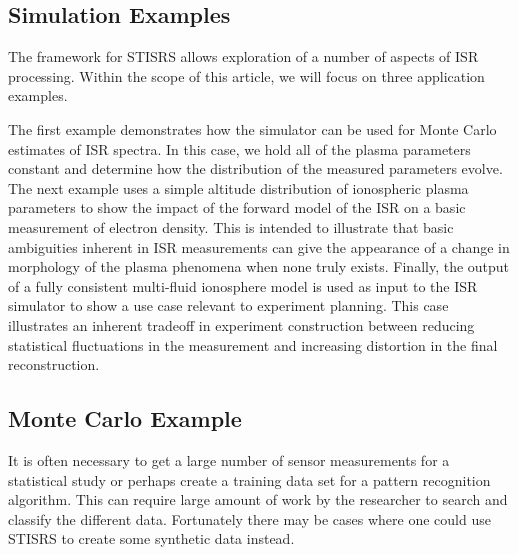 \documentclass[draft,ras]{agutex}
\newcommand{\pcom}[2]{\marginpar{{\footnotesize \bf #1}}{\it {#2}}}
\begin{document}
\begin{article}

\section{Simulation Examples}
The framework for STISRS allows exploration of a number of aspects of ISR processing. Within the scope of this article, we will focus on three application examples.

The first example demonstrates how the simulator can be used for Monte Carlo estimates of ISR spectra. In this case, we hold all of the plasma parameters constant and determine how the distribution of the measured parameters evolve. The next example uses a simple altitude distribution of ionospheric plasma parameters to show the impact of the forward model of the ISR on a basic measurement of electron density. This is intended to illustrate that basic ambiguities inherent in ISR measurements can give the appearance of a change in morphology of the plasma phenomena when none truly exists. Finally, the output of a fully consistent multi-fluid ionosphere model is used as input to the ISR simulator to show a use case relevant to experiment planning. This case illustrates an inherent tradeoff in experiment construction between reducing statistical fluctuations in the measurement and increasing distortion in the final reconstruction.

\subsection{Monte Carlo Example}

It is often necessary to get a large number of sensor measurements for a statistical study or perhaps create a training data set for a pattern recognition algorithm. This can require large amount of work by the researcher to search and classify the different data. Fortunately there may be cases where one could use STISRS to create some synthetic data instead.



\end{article}
\end{document}
